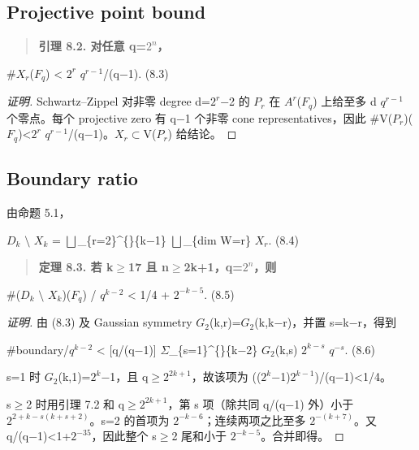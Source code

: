 \documentclass[11pt]{ctexart}
\begin{document}
\subsection{Projective point bound}

\begin{quote}\textbf{引理 8.2. 对任意 q=\ensuremath{2^{n}}，}\end{quote}

\#\ensuremath{X_{r}}(\ensuremath{F_{q}}) < \ensuremath{2^{r}} \ensuremath{q^{r−1}}/(q−1).    (8.3)

\begin{proof}[证明] 

Schwartz–Zippel 对非零 degree d=\ensuremath{2^{r}}−2 的 \ensuremath{P_{r}} 在 \ensuremath{A^{r}}(\ensuremath{F_{q}}) 上给至多 d \ensuremath{q^{r−1}} 个零点。每个 projective zero 有 q−1 个非零 cone representatives，因此 \#V(\ensuremath{P_{r}})(\ensuremath{F_{q}})<\ensuremath{2^{r}} \ensuremath{q^{r−1}}/(q−1)。\ensuremath{X_{r}}\ensuremath{\subset}V(\ensuremath{P_{r}}) 给结论。

\end{proof}

\subsection{Boundary ratio}

由命题 5.1，

\ensuremath{D_{k}} \ensuremath{\setminus} \ensuremath{X_{k}} = \ensuremath{\bigsqcup}\_\{r=2\}\textasciicircum\{\}\{k−1\} \ensuremath{\bigsqcup}\_\{dim W=r\} \ensuremath{X_{r}}.    (8.4)

\begin{quote}\textbf{定理 8.3. 若 k\ensuremath{\ge}17 且 n\ensuremath{\ge}2k+1，q=\ensuremath{2^{n}}，则}\end{quote}

\#(\ensuremath{D_{k}} \ensuremath{\setminus} \ensuremath{X_{k}})(\ensuremath{F_{q}}) / \ensuremath{q^{k−2}} < 1/4 + \ensuremath{2^{−k−5}}.    (8.5)

\begin{proof}[证明] 

由 (8.3) 及 Gaussian symmetry \ensuremath{G_2}(k,r)=\ensuremath{G_2}(k,k−r)，并置 s=k−r，得到

\#boundary/\ensuremath{q^{k−2}} < [q/(q−1)] \ensuremath{\Sigma}\_\{s=1\}\textasciicircum\{\}\{k−2\} \ensuremath{G_2}(k,s) \ensuremath{2^{k−s}} \ensuremath{q^{−s}}.    (8.6)

s=1 时 \ensuremath{G_2}(k,1)=\ensuremath{2^{k}}−1，且 q\ensuremath{\ge}\ensuremath{2^{2k+1}}，故该项为 ((\ensuremath{2^{k}}−1)\ensuremath{2^{k−1}})/(q−1)<1/4。

s\ensuremath{\ge}2 时用引理 7.2 和 q\ensuremath{\ge}\ensuremath{2^{2k+1}}，第 s 项（除共同 q/(q−1) 外）小于 \ensuremath{2^{2+k−s(k+s+2)}}。s=2 的首项为 \ensuremath{2^{−k−6}}；连续两项之比至多 \ensuremath{2^{−(k+7)}}。又 q/(q−1)<1+\ensuremath{2^{-35}}，因此整个 s\ensuremath{\ge}2 尾和小于 \ensuremath{2^{−k−5}}。合并即得。

\end{proof}
\end{document}
